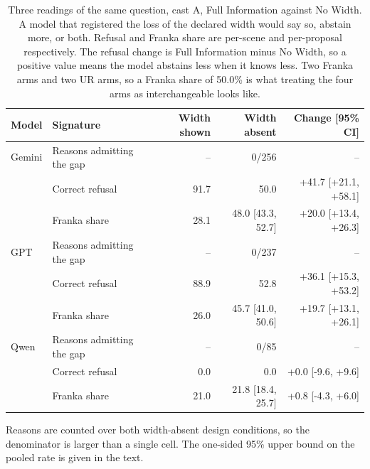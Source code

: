 \begin{table}[H]
  \centering
  \caption{Three readings of the same question, cast A, Full Information against No Width. A model that registered the loss of the declared width would say so, abstain more, or both. Refusal and Franka share are per-scene and per-proposal respectively. The refusal change is Full Information minus No Width, so a positive value means the model abstains less when it knows less. Two Franka arms and two UR arms, so a Franka share of 50.0\% is what treating the four arms as interchangeable looks like.}
  \label{tab:ex1:signatures}
  \small
  \begin{tabular}{llrrr}
    \toprule
    Model & Signature & Width shown & Width absent & Change [95\% CI] \\
    \midrule
    Gemini & Reasons admitting the gap & -- & 0/256 & -- \\
     & Correct refusal & 91.7 & 50.0 & +41.7 [+21.1, +58.1] \\
     & Franka share & 28.1 & 48.0 [43.3, 52.7] & +20.0 [+13.4, +26.3] \\
    GPT & Reasons admitting the gap & -- & 0/237 & -- \\
     & Correct refusal & 88.9 & 52.8 & +36.1 [+15.3, +53.2] \\
     & Franka share & 26.0 & 45.7 [41.0, 50.6] & +19.7 [+13.1, +26.1] \\
    Qwen & Reasons admitting the gap & -- & 0/85 & -- \\
     & Correct refusal & 0.0 & 0.0 & +0.0 [-9.6, +9.6] \\
     & Franka share & 21.0 & 21.8 [18.4, 25.7] & +0.8 [-4.3, +6.0] \\
    \bottomrule
  \end{tabular}
  \begin{minipage}{\linewidth}\vspace{2pt}\footnotesize Reasons are counted over both width-absent design conditions, so the denominator is larger than a single cell. The one-sided 95\% upper bound on the pooled rate is given in the text.\end{minipage}
\end{table}
